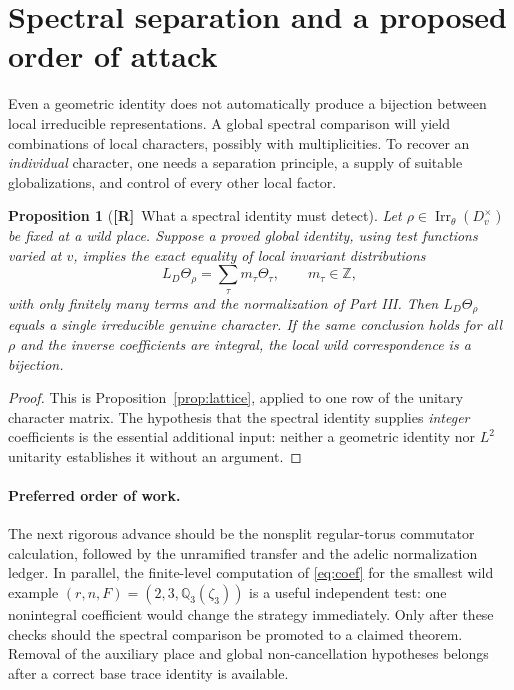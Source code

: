\documentclass[11pt]{article}
\newcommand{\Z}{\mathbb Z}
\newcommand{\Irr}{\operatorname{Irr}}
\newcommand{\Rtag}{\textnormal{\textbf{[R]}}}
\theoremstyle{plain}
\newtheorem{proposition}[theorem]{Proposition}
\theoremstyle{definition}
\begin{document}
\section{Spectral separation and a proposed order of attack}\label{sec:spectral}
Even a geometric identity does not automatically produce a
bijection between local irreducible representations.  A global
spectral comparison will yield combinations of local characters,
possibly with multiplicities.  To recover an \emph{individual}
character, one needs a separation principle, a supply of suitable
globalizations, and control of every other local factor.

\begin{proposition}[\Rtag\ What a spectral identity must detect]\label{prop:spectral}
Let $\rho\in\Irr_\theta(D_v^\times)$ be fixed at a wild place.
Suppose a proved global identity, using test functions varied at $v$,
implies the exact equality of local invariant distributions
\[
 L_D\Theta_\rho=\sum_{\tau}m_\tau\Theta_\tau,
 \qquad m_\tau\in\Z,
\]
with only finitely many terms and the normalization of Part III.
Then $L_D\Theta_\rho$ equals a single irreducible genuine
character.  If the same conclusion holds for all $\rho$ and the
inverse coefficients are integral, the local wild correspondence is a
bijection.
\end{proposition}
\begin{proof}
This is Proposition~\ref{prop:lattice}, applied to one row of the
unitary character matrix.  The hypothesis that the spectral identity
supplies \emph{integer} coefficients is the essential additional
input: neither a geometric identity nor $L^2$ unitarity establishes
it without an argument.
\end{proof}

\paragraph{Preferred order of work.}
The next rigorous advance should be the nonsplit regular-torus
commutator calculation, followed by the unramified transfer and the
adelic normalization ledger.  In parallel, the finite-level
computation of \eqref{eq:coef} for the smallest wild example
$(r,n,F)=(2,3,\mathbb Q_3(\zeta_3))$ is a useful independent test:
one nonintegral coefficient would change the strategy immediately.
Only after these checks should the spectral comparison be promoted
to a claimed theorem.  Removal of the auxiliary place and global
non-cancellation hypotheses belongs after a correct base trace
identity is available.
\end{document}
